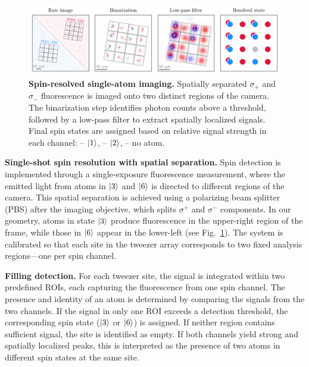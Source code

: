 
\begin{figure}
    \centering
    \includegraphics{fig-py/imaging-spin-resolved.pdf}
    \caption{
        \textbf{Spin-resolved single-atom imaging.}
        Spatially separated $\sigma_+$ and $\sigma_-$ fluorescence is imaged onto two distinct regions of the camera. The binarization step identifies photon counts above a threshold, followed by a low-pass filter to extract spatially localized signals. Final spin states are assigned based on relative signal strength in each channel:
        \raisebox{-1pt}{\scalebox{1.5}{\textcolor{ublue}{\textbullet}}} -- $\left| 1 \right\rangle$, 
        \raisebox{-1pt}{\scalebox{1.5}{\textcolor{ured}{\textbullet}}} -- $\left| 2 \right\rangle$, 
        \raisebox{-1pt}{\scalebox{1.5}{\textcolor{uhole}{\textbullet}}} -- no atom.
    }
    \label{fig:spin-resolved}
\end{figure}


\textbf{Single-shot spin resolution with spatial separation.}  
Spin detection is implemented through a single-exposure fluorescence measurement, where the emitted light from atoms in $\left| 3 \right\rangle$ and $\left| 6 \right\rangle$ is directed to different regions of the camera. This spatial separation is achieved using a polarizing beam splitter (PBS) after the imaging objective, which splits $\sigma^+$ and $\sigma^-$ components. In our geometry, atoms in state $\left| 3 \right\rangle$ produce fluorescence in the upper-right region of the frame, while those in $\left| 6 \right\rangle$ appear in the lower-left (see Fig.~\ref{fig:spin-resolved}). The system is calibrated so that each site in the tweezer array corresponds to two fixed analysis regions—one per spin channel.

\textbf{Filling detection.}  
For each tweezer site, the signal is integrated within two predefined ROIs, each capturing the fluorescence from one spin channel. The presence and identity of an atom is determined by comparing the signals from the two channels. If the signal in only one ROI exceeds a detection threshold, the corresponding spin state ($\left| 3 \right\rangle$ or $\left| 6 \right\rangle$) is assigned. If neither region contains sufficient signal, the site is identified as empty. If both channels yield strong and spatially localized peaks, this is interpreted as the presence of two atoms in different spin states at the same site.

